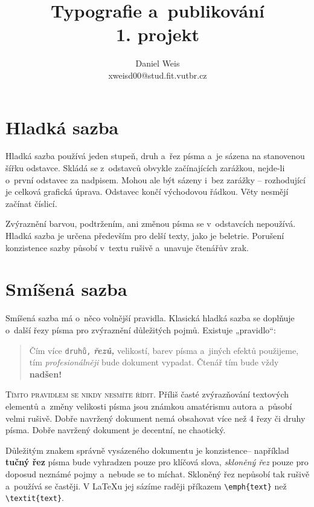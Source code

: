 \documentclass[a4paper, 10pt, twocolumn]{article}
\title{Typografie a~publikování \\1. projekt}
\author{Daniel Weis \\xweisd00@stud.fit.vutbr.cz}
\date{}
\begin{document}
\maketitle

\section{Hladká sazba}

Hladká sazba používá jeden stupeň, druh a~řez písma\linebreak
a~je sázena na stanovenou šířku odstavce. Skládá se z~odstavců
obvykle začínajících zarážkou, nejde-li o~první odstavec
za nadpisem. Mohou ale být sázeny i~bez zarážky –
rozhodující je celková grafická úprava. Odstavec končí východovou
řádkou. Věty nesmějí začínat číslicí.
\par Zvýraznění barvou, podtržením, ani změnou písma se
v~odstavcích nepoužívá. Hladká sazba je určena především
pro delší texty, jako je beletrie. Porušení konzistence sazby
působí v~textu rušivě a~unavuje čtenářův zrak.

\section{Smíšená sazba}

Smíšená sazba má o~něco volnější pravidla. Klasická hladká
sazba se doplňuje o~další řezy písma pro zvýraznění důležitých
pojmů. Existuje „pravidlo“:

\begin{quotation}
Čím více \texttt{druhů,} \textbf{\emph{řezů,}} {\small velikostí}, barev písma {\selectfont a~jiných efektů} použijeme, tím \emph{profesionálněji} bude dokument vypadat. Čtenář tím {\tiny bude} vždy \textbf{\huge nadšen!}
\end{quotation}

\textsc{Tímto pravidlem se nikdy nesmíte řídit}. Příliš
časté zvýrazňování textových elementů a~změny velikosti
písma jsou známkou amatérismu autora a~působí velmi rušivě.
Dobře navržený dokument nemá obsahovat více než
4 řezy či druhy písma. Dobře navržený dokument je decentní,
ne chaotický.

\par Důležitým znakem správně vysázeného dokumentu je
konzistence-- například \textbf{tučný řez} písma bude vyhradzen
pouze pro klíčová slova, \textit{skloněný řez} pouze pro doposud
neznámé pojmy a~nebude se to míchat. Skloněný řez nepůsobí
tak rušivě a~používá se častěji. V \LaTeX{u} jej sázíme
raději příkazem \verb!\emph{text}! než \verb!\textit{text}!.
\end{document}
